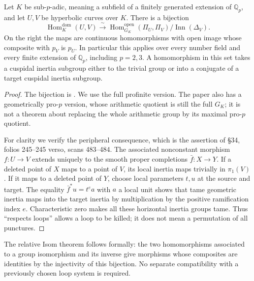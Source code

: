 Let $K$ be sub-$p$-adic, meaning a subfield of a finitely generated extension
of $\mathbb Q_p$, and let $U,V$ be hyperbolic curves over $K$.  There is a
bijection
\[
 \operatorname{Hom}^{\mathrm{dom}}_K(U,V)
 \xrightarrow{\ \sim\ }
 \operatorname{Hom}^{\mathrm{open}}_{G_K}(\Pi_U,\Pi_V)/\operatorname{Inn}(\Delta_V).
\]
On the right the maps are continuous homomorphisms with open image whose
composite with $p_V$ is $p_U$.  In particular this applies over every number
field and every finite extension of $\mathbb Q_p$, including $p=2,3$.
A homomorphism in this set takes a cuspidal inertia subgroup either to the
trivial group or into a conjugate of a target cuspidal inertia subgroup.
\begin{proof}
The bijection is \citet[Theorem A; Theorem 16.5 and its following
Remark]{Mochizuki1999}.  We use the full profinite version.  The paper also has a
geometrically pro-$p$ version, whose arithmetic quotient is still the full
$G_K$; it is not a theorem about replacing the whole arithmetic group by its
maximal pro-$p$ quotient.

For clarity we verify the peripheral consequence, which is the assertion of
\S34, folios 245--245 verso, scans 483--484.  The associated nonconstant morphism
$f:U\to V$ extends uniquely to the smooth proper completions $\bar f:X\to Y$.
If a deleted point of $X$ maps to a point of $V$, its local inertia maps trivially
in $\pi_1(V)$.  If it maps to a deleted point of $Y$, choose local parameters
$t,u$ at the source and target.  The equality $\bar f^*u=t^e a$ with $a$ a local
unit shows that tame geometric inertia maps into the target inertia by
multiplication by the positive ramification index $e$.  Characteristic zero
makes all these horizontal inertia groups tame.  Thus ``respects loops''
allows a loop to be killed; it does not mean a permutation of all punctures.
\end{proof}
The relative Isom theorem follows formally: the two homomorphisms associated
to a group isomorphism and its inverse give morphisms whose composites are
identities by the injectivity of this bijection.  No separate compatibility
with a previously chosen loop system is required.

